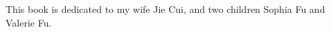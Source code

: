 
%
%
%

\begin{dedication}
This book is dedicated to my wife Jie Cui, and two children Sophia Fu and Valerie Fu.
\end{dedication}




